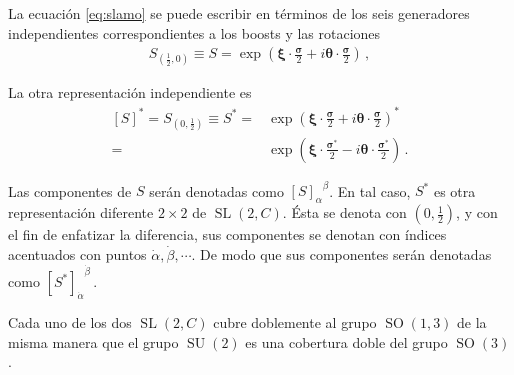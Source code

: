 \begin{frame}
La ecuación \eqref{eq:slamo} se puede escribir en términos de los seis generadores independientes correspondientes a los boosts y las rotaciones
\begin{align}
\label{eq:SLet}
  S_{\left( \frac{1}{2},0 \right)}\equiv S=
\exp\left( \boldsymbol{\xi}\cdot \frac{\boldsymbol{\sigma}}{2}+i\boldsymbol{\theta}\cdot \frac{\boldsymbol{\sigma}}{2} \right)\,,
\end{align}


La otra representación independiente es
\begin{align}
\label{eq:SLet}
\left[S\right]^{*} = S_{\left(0,\frac{1}{2} \right)}\equiv S^{*}=&
\exp\left( \boldsymbol{\xi}\cdot \frac{\boldsymbol{\sigma}}{2}+i\boldsymbol{\theta}\cdot \frac{\boldsymbol{\sigma}}{2} \right)^{*}\nonumber\\
=&\exp\left( \boldsymbol{\xi}\cdot \frac{\boldsymbol{\sigma}^{*}}{2}-i\boldsymbol{\theta}\cdot \frac{\boldsymbol{\sigma}^{*}}{2} \right)\,.
\end{align}
 
Las componentes de $S$ serán denotadas como  ${\left[ S \right]_{\alpha}}^{\beta}$. En tal caso, $S^{*}$ es otra representación diferente $2\times 2$ de $\operatorname{SL}(2,C)$. Ésta se denota con $\left( 0,\frac{1}{2}\right)$, y con el fin de enfatizar la diferencia, sus componentes se denotan con índices acentuados con puntos  $\dot{\alpha},\dot{\beta},\cdots$. De modo que sus componentes serán denotadas como ${\left[ S^{*} \right]_{\dot{\alpha}}}^{\dot{\beta}}$\,.
\end{frame}

Cada uno de los dos $\operatorname{SL}(2,C)$ cubre doblemente al grupo $\operatorname{SO}(1,3)$ de la misma manera que el grupo $\operatorname{SU}(2)$ es una cobertura doble del grupo $\operatorname{SO}(3)$.

